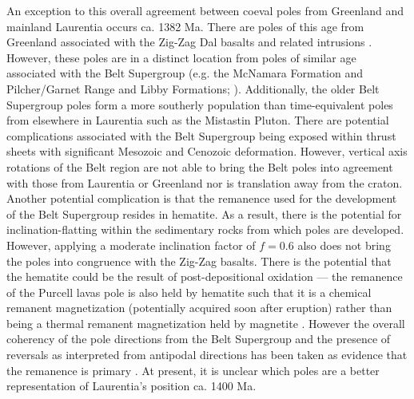 \documentclass[twocolumn, switch]{article} %
\begin{document}
An exception to this overall agreement between coeval poles from Greenland and mainland Laurentia occurs ca. 1382 Ma. There are poles of this age from Greenland associated with the Zig-Zag Dal basalts and related intrusions \citep{Marcussen1983a, Abrahamsen1987a}. However, these poles are in a distinct location from poles of similar age associated with the Belt Supergroup (e.g. the McNamara Formation and Pilcher/Garnet Range and Libby Formations; \citealp{Elston2002a}). Additionally, the older Belt Supergroup poles form a more southerly population than time-equivalent poles from elsewhere in Laurentia such as the Mistastin Pluton. There are potential complications associated with the Belt Supergroup being exposed within thrust sheets with significant Mesozoic and Cenozoic deformation. However, vertical axis rotations of the Belt region are not able to bring the Belt poles into agreement with those from Laurentia or Greenland nor is translation away from the craton. Another potential complication is that the remanence used for the development of the Belt Supergroup resides in hematite. As a result, there is the potential for inclination-flatting within the sedimentary rocks from which poles are developed. However, applying a moderate inclination factor of $f=0.6$ also does not bring the poles into congruence with the Zig-Zag basalts. There is the potential that the hematite could be the result of post-depositional oxidation --- the remanence of the Purcell lavas pole is also held by hematite such that it is a chemical remanent magnetization (potentially acquired soon after eruption) rather than being a thermal remanent magnetization held by magnetite \citep{Elston2002a}. However the overall coherency of the pole directions from the Belt Supergroup and the presence of reversals as interpreted from antipodal directions has been taken as evidence that the remanence is primary \citep{Elston2002a}. At present, it is unclear which poles are a better representation of Laurentia's position ca. 1400 Ma.
\end{document}

